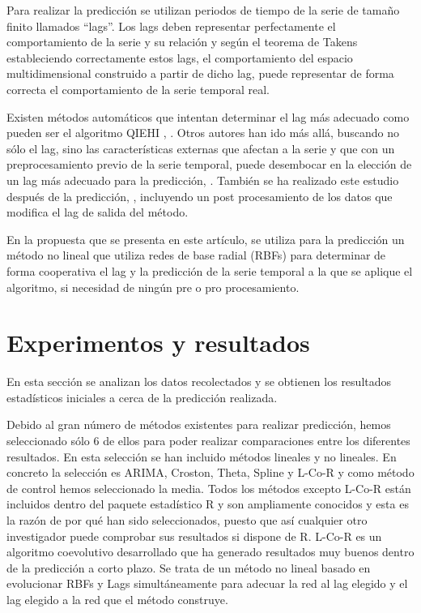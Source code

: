 \documentclass[runningheads]{llncs}
\begin{document}
Para realizar la predicción se utilizan periodos de tiempo de la serie de tamaño
finito llamados ``lags''. Los lags deben representar perfectamente el comportamiento de la serie y
su relación y según el teorema de Takens \cite{Takens1980} estableciendo correctamente 
estos lags, el comportamiento del espacio multidimensional construido a partir de dicho lag, puede
representar de forma correcta el comportamiento de la serie temporal real. 

Existen métodos automáticos que intentan determinar el lag más adecuado como pueden ser el
algoritmo QIEHI \cite{Araujo2010a}, \cite{Araujo2010b}. Otros autores han ido más allá, %
buscando no sólo el lag, sino las características externas que afectan a la serie y que con un
preprocesamiento previo de la serie temporal, puede desembocar en la elección de un lag  más
adecuado para la predicción, \cite{garcia2008}. También se ha realizado este estudio después de la
predicción,  \cite{Maus2011}, incluyendo un post procesamiento de los datos que modifica el lag de
salida del método. 

En la propuesta que se presenta en este artículo, se utiliza para la predicción un método no
lineal que utiliza redes de base radial (RBFs) para determinar de forma cooperativa el lag y la
predicción de la serie temporal a la que se aplique el algoritmo, si necesidad de ningún pre o pro
procesamiento. %



\section{Experimentos y resultados}
\label{sec:experiments}

En esta sección se analizan los datos recolectados y se obtienen los resultados estadísticos
iniciales a cerca de la predicción realizada. 

Debido al gran número de métodos existentes para realizar predicción, hemos seleccionado sólo 6 de
ellos para poder realizar comparaciones entre los diferentes resultados. En esta selección se han
incluido métodos lineales y no lineales. En concreto la selección es
ARIMA, Croston, Theta, Spline y L-Co-R y como método de control hemos seleccionado la media.
Todos los métodos excepto L-Co-R están incluidos dentro del paquete estadístico R y son ampliamente conocidos y esta es la razón
de por qué han sido seleccionados, puesto que así cualquier otro investigador puede comprobar sus resultados si dispone de R.
L-Co-R \cite{Eli2012} es un algoritmo coevolutivo 
desarrollado que ha generado resultados muy buenos dentro
de la predicción a corto plazo. Se trata de un método no lineal basado en evolucionar RBFs y Lags
simultáneamente para adecuar la red al lag elegido y el lag elegido a la red que el método
construye.
\end{document}
